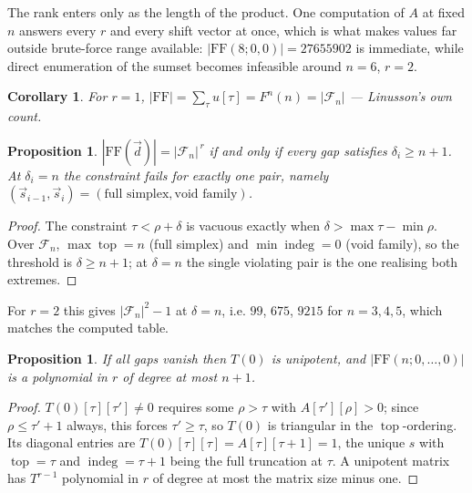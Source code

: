 \documentclass[11pt, a4paper, abstract=yes]{scrartcl}
\theoremstyle{definition}
\theoremstyle{remark}
\theoremstyle{plain}
\newtheorem{proposition}[definition]{Proposition}
\newtheorem{corollary}[definition]{Corollary}
\newcommand{\vek}[1]{\boldsymbol{#1}}
\newcommand{\indeg}{\operatorname{indeg}}
\newcommand{\tp}{\operatorname{top}}
\renewcommand{\vek}[1]{\vec{#1}}
\begin{document}
The rank enters only as the length of the product. One computation of \(A\) at fixed \(n\) answers
every \(r\) and every shift vector at once, which is what makes values far outside brute-force range
available: \(|\mathrm{FF}(8;0,0)|=27655902\) is immediate, while direct enumeration of the sumset
becomes infeasible around \(n=6\), \(r=2\).

\begin{corollary}
For \(r=1\), \(|\mathrm{FF}|=\sum_\tau u[\tau]=F^n(n)=|\mathcal F_n|\) --- Linusson's own count.
\label{org1eb04b0}
\end{corollary}

\begin{proposition}
\(|\mathrm{FF}(\vek d)|=|\mathcal F_n|^{\,r}\) if and only if every gap satisfies \(\delta_i\ge n+1\).
At \(\delta_i=n\) the constraint fails for exactly one pair, namely
\((\vek s_{i-1},\vek s_i)=(\text{full simplex},\text{void family})\).
\label{org4ddf98c}
\end{proposition}

\begin{proof}
The constraint \(\tau<\rho+\delta\) is vacuous exactly when \(\delta>\max\tau-\min\rho\). Over
\(\mathcal F_n\), \(\max\tp=n\) (full simplex) and \(\min\indeg=0\) (void family), so the threshold is
\(\delta\ge n+1\); at \(\delta=n\) the single violating pair is the one realising both extremes.
\end{proof}

For \(r=2\) this gives \(|\mathcal F_n|^2-1\) at \(\delta=n\), i.e. \(99\), \(675\), \(9215\) for
\(n=3,4,5\), which matches the computed table.

\begin{proposition}
If all gaps vanish then \(T(0)\) is unipotent, and \(|\mathrm{FF}(n;0,\dots,0)|\) is a polynomial in
\(r\) of degree at most \(n+1\).
\label{org2adde05}
\end{proposition}

\begin{proof}
\(T(0)[\tau][\tau']\ne0\) requires some \(\rho>\tau\) with \(A[\tau'][\rho]>0\); since
\(\rho\le\tau'+1\) always, this forces \(\tau'\ge\tau\), so \(T(0)\) is triangular in the
\(\tp\)-ordering. Its diagonal entries are \(T(0)[\tau][\tau]=A[\tau][\tau+1]=1\), the unique
\(s\) with \(\tp=\tau\) and \(\indeg=\tau+1\) being the full truncation at \(\tau\). A unipotent
matrix has \(T^{r-1}\) polynomial in \(r\) of degree at most the matrix size minus one.
\end{proof}
\end{document}
